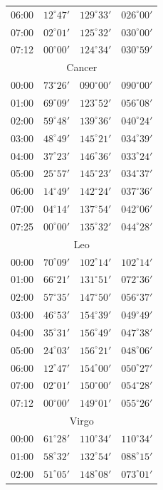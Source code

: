 \begin{table}[!h]
\begin{Parallel}{}{}
{{\begin{tabular}{l|lll}
06:00 & $12^\circ 47'$ & $129^\circ 33'$ & $026^\circ 00'$\\
07:00 & $02^\circ 01'$ & $125^\circ 32'$ & $030^\circ 00'$\\
07:12 & $00^\circ 00'$ & $124^\circ 34'$ & $030^\circ 59'$\\
\multicolumn{4}{c}{Cancer}\\
00:00 & $73^\circ 26'$ & $090^\circ 00'$ & $090^\circ 00'$\\
01:00 & $69^\circ 09'$ & $123^\circ 52'$ & $056^\circ 08'$\\
02:00 & $59^\circ 48'$ & $139^\circ 36'$ & $040^\circ 24'$\\
03:00 & $48^\circ 49'$ & $145^\circ 21'$ & $034^\circ 39'$\\
04:00 & $37^\circ 23'$ & $146^\circ 36'$ & $033^\circ 24'$\\
05:00 & $25^\circ 57'$ & $145^\circ 23'$ & $034^\circ 37'$\\
06:00 & $14^\circ 49'$ & $142^\circ 24'$ & $037^\circ 36'$\\
07:00 & $04^\circ 14'$ & $137^\circ 54'$ & $042^\circ 06'$\\
07:25 & $00^\circ 00'$ & $135^\circ 32'$ & $044^\circ 28'$\\
\multicolumn{4}{c}{Leo}\\
00:00 & $70^\circ 09'$ & $102^\circ 14'$ & $102^\circ 14'$\\
01:00 & $66^\circ 21'$ & $131^\circ 51'$ & $072^\circ 36'$\\
02:00 & $57^\circ 35'$ & $147^\circ 50'$ & $056^\circ 37'$\\
03:00 & $46^\circ 53'$ & $154^\circ 39'$ & $049^\circ 49'$\\
04:00 & $35^\circ 31'$ & $156^\circ 49'$ & $047^\circ 38'$\\
05:00 & $24^\circ 03'$ & $156^\circ 21'$ & $048^\circ 06'$\\
06:00 & $12^\circ 47'$ & $154^\circ 00'$ & $050^\circ 27'$\\
07:00 & $02^\circ 01'$ & $150^\circ 00'$ & $054^\circ 28'$\\
07:12 & $00^\circ 00'$ & $149^\circ 01'$ & $055^\circ 26'$\\
\multicolumn{4}{c}{Virgo}\\
00:00 & $61^\circ 28'$ & $110^\circ 34'$ & $110^\circ 34'$\\
01:00 & $58^\circ 32'$ & $132^\circ 54'$ & $088^\circ 15'$\\
02:00 & $51^\circ 05'$ & $148^\circ 08'$ & $073^\circ 01'$\\

\end{tabular}}}
\end{Parallel}
\end{table}
